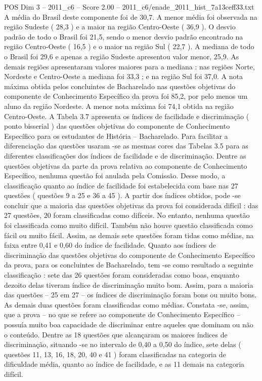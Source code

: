 \begin{textsample}{POS Dim 3 – 2011\_c6 – Score 2.00 – 2011\_c6/enade\_2011\_hist\_7a13ceff33.txt}
A média do Brasil deste componente foi de 30,7.
A menor média foi observada na região Sudeste ( 28,3 ) e a maior na região Centro-Oeste ( 36,9 ).
O desvio padrão de todo o Brasil foi 21,5, sendo o menor desvio padrão encontrado na região Centro-Oeste ( 16,5 ) e o maior na região Sul ( 22,7 ).
A mediana de todo o Brasil foi 29,6 e apenas a região Sudeste apresentou valor menor, 25,9.
As demais regiões apresentaram valores maiores para a mediana : nas regiões Norte, Nordeste e Centro-Oeste a mediana foi 33,3 ; e na região Sul foi 37,0.
A nota máxima obtida pelos concluintes de Bacharelado nas questões objetivas do componente de Conhecimento Específico da prova foi 85,2, por pelo menos um aluno da região Nordeste.
A menor nota máxima foi 74,1 obtida na região Centro-Oeste.
A Tabela 3.7 apresenta os índices de facilidade e discriminação ( ponto bisserial ) das questões objetivas do componente de Conhecimento Específico para os estudantes de História – Bacharelado.
Para facilitar a diferenciação das questões usaram -se as mesmas cores das Tabelas 3.5 para as diferentes classificações dos índices de facilidade e de discriminação.
Dentre as questões objetivas da parte da prova relativa ao componente de Conhecimento Específico, nenhuma questão foi anulada pela Comissão.
Desse modo, a classificação quanto ao índice de facilidade foi estabelecida com base nas 27 questões ( questões 9 a 25 e 36 a 45 ).
A partir dos índices obtidos, pode -se concluir que a maioria das questões objetivas da prova foi considerada difícil : das 27 questões, 20 foram classificadas como difíceis.
No entanto, nenhuma questão foi classificada como muito difícil.
Também não houve questão classificada como fácil ou muito fácil.
Assim, as demais sete questões foram tidas como médias, na faixa entre 0,41 e 0,60 do índice de facilidade.
Quanto aos índices de discriminação das questões objetivas do componente de Conhecimento Específico da prova, para os concluintes de Bacharelado, tem -se como resultado a seguinte classificação : sete das 26 questões foram consideradas como boas, enquanto dezoito delas tiveram índice de discriminação muito bom.
Assim, para a maioria das questões – 25 em 27 – os índices de discriminação foram bons ou muito bons.
As demais duas questões foram classificadas como médias.
Constata -se, assim, que a prova – no que se refere ao componente de Conhecimento Específico – possuía muito boa capacidade de discriminar entre aqueles que dominam ou não o conteúdo.
Dentre as 18 questões que alcançaram os maiores índices de discriminação, situando -se no intervalo de 0,40 a 0,50 do índice, sete delas ( questões 11, 13, 16, 18, 20, 40 e 41 ) foram classificadas na categoria de dificuldade média, quanto ao índice de facilidade, e as 11 demais na categoria difícil.

\end{textsample}

